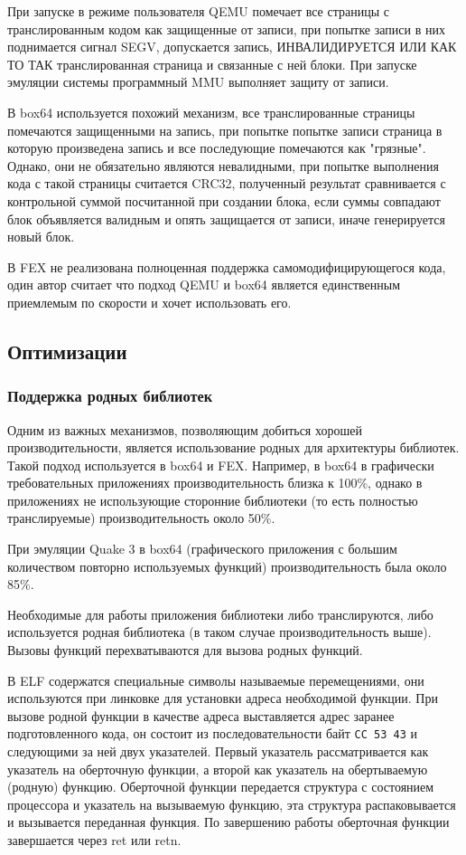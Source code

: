 При запуске в режиме пользователя QEMU помечает все страницы с транслированным кодом как защищенные от записи, при попытке записи в них поднимается сигнал SEGV, допускается запись, ИНВАЛИДИРУЕТСЯ ИЛИ КАК ТО ТАК транслированная страница и связанные с ней блоки. При запуске эмуляции системы программный MMU выполняет защиту от записи. \cite{qemu_docs}

В box64 используется похожий механизм, все транслированные страницы помечаются защищенными на запись, при попытке попытке записи страница в которую произведена запись и все последующие помечаются как "грязные". Однако, они не обязательно являются невалидными, при попытке выполнения кода с такой страницы считается CRC32, полученный результат сравнивается с контрольной суммой посчитанной при создании блока, если суммы совпадают блок объявляется валидным и опять защищается от записи, иначе генерируется новый блок. \cite{box64_letter}

В FEX не реализована полноценная поддержка самомодифицирующегося кода, один автор считает что подход QEMU и box64 является единственным приемлемым по скорости и хочет использовать его. \cite{FEX_letter}

\subsection{Оптимизации}

\subsubsection{Поддержка родных библиотек}

Одним из важных механизмов, позволяющим добиться хорошей производительности, является использование родных для архитектуры библиотек. Такой подход используется в box64 и FEX. Например, в box64 в графически требовательных приложениях производительность близка к 100\%, однако в приложениях не использующие сторонние библиотеки (то есть полностью транслируемые) производительность около 50\%.

При эмуляции Quake 3 в box64 (графического приложения с большим количеством повторно используемых функций) производительность была около 85\%.

Необходимые для работы приложения библиотеки либо транслируются, либо используется родная библиотека (в таком случае производительность выше). Вызовы функций перехватываются для вызова родных функций. 

В ELF содержатся специальные символы называемые перемещениями, они используются при линковке для установки адреса необходимой функции. При вызове родной функции в качестве адреса выставляется адрес заранее подготовленного кода, он состоит из последовательности байт \texttt{CC 53 43} и следующими за ней двух указателей. Первый указатель рассматривается как указатель на оберточную функции, а второй как указатель на обертываемую (родную) функцию. Оберточной функции передается структура с состоянием процессора и указатель на вызываемую функцию, эта структура распаковывается и вызывается переданная функция. По завершению работы оберточная функции завершается через ret или retn.

